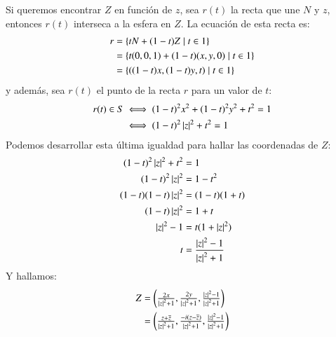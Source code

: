 \begin{obs}
\begin{center}
        \end{center}
        Si queremos encontrar $Z$ en función de $z$, sea $r(t)$ la recta que une $N$ y $z$, entonces $r(t)$ interseca a la esfera en $Z$. La ecuación de esta recta es:
        \begin{align*}
            r &= \left\{tN + (1-t)Z \mid t \in 1\right\}\\
            &= \left\{t(0, 0, 1) + (1-t)(x, y, 0) \mid t \in 1\right\}\\
            &= \left\{((1-t)x, (1-t)y, t) \mid t \in 1\right\}
        \end{align*}
        y además, sea $r(t)$ el punto de la recta $r$ para un valor de $t$:
        \begin{align*}
            r(t) \in S &\iff  (1-t)^2x^2+(1-t)^2y^2+t^2 = 1\\
                       &\iff (1-t)^2\left|z\right|^2 + t^2 = 1
        \end{align*}
        Podemos desarrollar esta última igualdad para hallar las coordenadas de $Z$:
        \begin{align*}
            (1-t)^2 \left|z\right|^2 + t^2 &= 1\\
            (1-t)^2 \left|z\right|^2 &= 1 - t^2\\
            (1-t)(1-t)\left|z\right|^2 &= (1-t)(1+t)\\
            (1-t)\left|z\right|^2 &= 1+t\\
            \left|z\right|^2 - 1 &= t(1+\left|z\right|^2)\\
            t &= \frac{\left|z\right|^2 -1}{\left|z\right|^2+1}
        \end{align*}
        Y hallamos:
        \begin{align*}
            Z &= \px{\frac{2x}{\vabs{z}^2+1}, \frac{2y}{\vabs{z}^2+1}, \frac{\vabs{z}^2-1}{\vabs{z}^2+1}}\\
            &= \px{\frac{z+\cnj z}{\vabs{z}^2+1}, \frac{-i(z-\cnj z)}{\vabs{z}^2+1}, \frac{\vabs{z}^2-1}{\vabs{z}^2+1}}
        \end{align*}


\end{obs}
